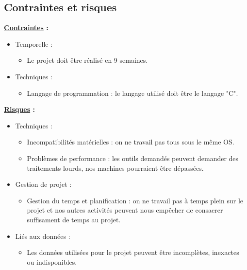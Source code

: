 \documentclass[a4paper, 12pt]{report}
\begin{document}
\subsection{Contraintes et risques}

\textbf{\underline{Contraintes} :}
\begin{itemize}
    \item Temporelle :
          \begin{itemize}
              \item Le projet doit être réalisé en 9 semaines.
          \end{itemize}
    \item Techniques :
          \begin{itemize}
              \item Langage de programmation : le langage utilisé doit être le langage "C".
          \end{itemize}
\end{itemize}
\bigskip

\textbf{\underline{Risques} :}
\begin{itemize}
    \item Techniques :
          \begin{itemize}
              \item Incompatibilités matérielles : on ne travail pas tous sous le même OS.
              \item Problèmes de performance : les outils demandés peuvent demander des traitements lourds, nos machines pourraient être dépassées.
          \end{itemize}
    \item Gestion de projet :
          \begin{itemize}
              \item Gestion du temps et planification : on ne travail pas à temps plein sur le projet et nos autres activités peuvent nous empêcher de consacrer suffisament de temps au projet.
          \end{itemize}
    \item Liés aux données :
          \begin{itemize}
              \item Les données utilisées pour le projet peuvent être incomplètes, inexactes ou indisponibles.
          \end{itemize}
\end{itemize}
\bigskip
\end{document}
